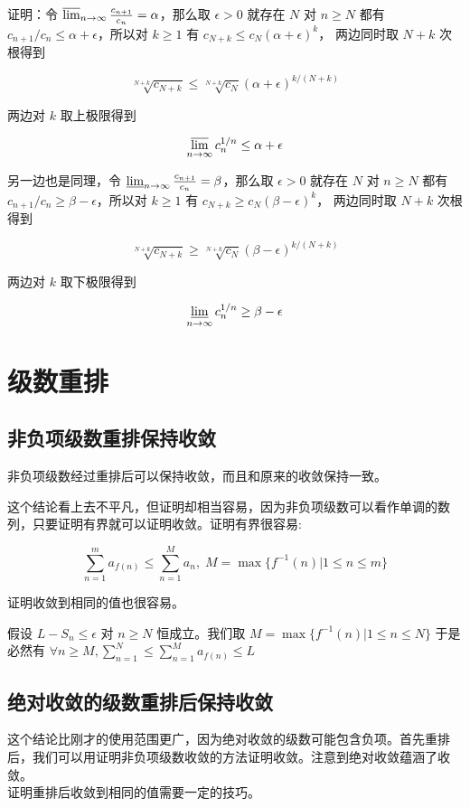 证明：令 $\varlimsup_{n \to \infty}\frac{c_{n+1}}{c_n} = \alpha$，那么取 $\epsilon > 0$ 就存在 $N$ 对 $n \ge N$ 都有 $c_{n+1}/c_n \le \alpha + \epsilon$，所以对 $k \ge 1$ 有 $c_{N+k} \le c_N (\alpha+\epsilon)^k$，
两边同时取 $N+k$ 次根得到 

\[ \sqrt[N+k]{c_{N+k}} \le \sqrt[N+k]{c_{N}} (\alpha+\epsilon)^{k/(N+k)} \]

两边对 $k$ 取上极限得到

\[ \varlimsup_{n \to \infty}c_n^{1/n} \le \alpha + \epsilon \]

另一边也是同理，令 $\varliminf_{n \to \infty}\frac{c_{n+1}}{c_n} = \beta$，那么取 $\epsilon > 0$ 就存在 $N$ 对 $n \ge N$ 都有 $c_{n+1}/c_n \ge \beta - \epsilon$，所以对 $k \ge 1$ 有 $c_{N+k} \ge c_N (\beta - \epsilon)^k$，
两边同时取 $N+k$ 次根得到 


\[ \sqrt[N+k]{c_{N+k}} \ge \sqrt[N+k]{c_{N}} {(\beta-\epsilon)}^{k/(N+k)} \]

两边对 $k$ 取下极限得到

\[ \varliminf_{n \to \infty}c_n^{1/n} \ge \beta - \epsilon \]
\section{级数重排}


\subsection{非负项级数重排保持收敛}

非负项级数经过重排后可以保持收敛，而且和原来的收敛保持一致。

这个结论看上去不平凡，但证明却相当容易，因为非负项级数可以看作单调的数列，只要证明有界就可以证明收敛。证明有界很容易:

\[ \sum_{n=1}^{m}a_{f(n)} \le \sum_{n=1}^{M}a_{n}, \; M = \max \{f^{-1}(n) \vert 1 \le n \le m \} \]

证明收敛到相同的值也很容易。

假设 $ L - S_n  \le \epsilon $ 对 $n \ge N$ 恒成立。我们取 $M = \max \{f^{-1}(n) \vert 1 \le n \le N \} $ 
于是必然有 $ \forall n \ge M, \sum_{n=1}^{N} \le \sum_{n=1}^{M}a_{f(n)} \le L $

\subsection{绝对收敛的级数重排后保持收敛}
这个结论比刚才的使用范围更广，因为绝对收敛的级数可能包含负项。首先重排后，我们可以用证明非负项级数收敛的方法证明收敛。注意到绝对收敛蕴涵了收敛。\\
证明重排后收敛到相同的值需要一定的技巧。

